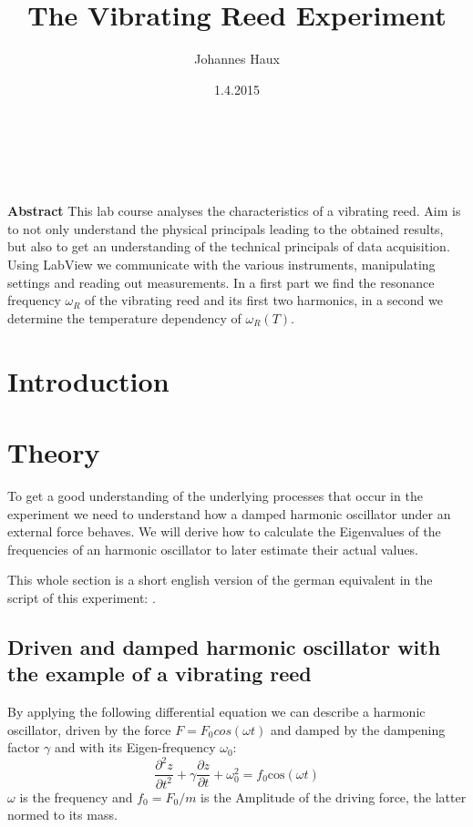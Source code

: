\documentclass[twoside, a4paper, DIV=11,twocolumn, 12pt]{book}
\title{The Vibrating Reed Experiment}
\author{Johannes Haux}
\date{1.4.2015}
\begin{document}
\onecolumn
\maketitle
{}

\chapter*{\,}

  \noindent \textbf{Abstract} \hspace{0.3cm} 
This lab course analyses the characteristics of a vibrating reed. Aim is to not only understand the physical 
principals leading to the obtained results, but also to get an understanding of the technical principals of 
data acquisition. Using LabView we communicate with the various instruments, manipulating settings and reading out measurements. 
In a first part we find the resonance frequency $\omega_R$ of the vibrating reed and its first two harmonics, in a 
second we determine the temperature dependency of $\omega_R(T)$.

\emptypage

\tableofcontents

\emptypage

\listoffigures

\newpage

\twocolumn
\balance %
\chapter{Introduction}
\label{sec:intro}

\chapter{Theory}
\label{sec:theo}

To get a good understanding of the underlying processes that occur in the experiment we need to understand how a damped harmonic
oscillator under an external force behaves. We will derive how to calculate the Eigenvalues of the frequencies of an harmonic oscillator to later estimate their actual values.

This whole section is a short english version of the german equivalent in the script of this experiment: \cite{fp75}.

\section{Driven and damped harmonic oscillator with the example of a vibrating reed}
\label{sec:osz}
By applying the following differential equation we can describe a harmonic oscillator, driven by the force $F = F_0 cos(\omega t)$ and damped by the dampening factor $\gamma$ and with its Eigen-frequency $\omega_0$:
\begin{equation}
 \frac{\partial^2z}{\partial t^2} + \gamma \frac{\partial z}{\partial t} + \omega_0^2 = f_0 \mathrm{cos}(\omega t)
 \label{eq:stAmp}
\end{equation}
$\omega$ is the frequency and $f_0 = F_0/m$ is the Amplitude of the driving force, the latter normed to its mass. 
\end{document}
